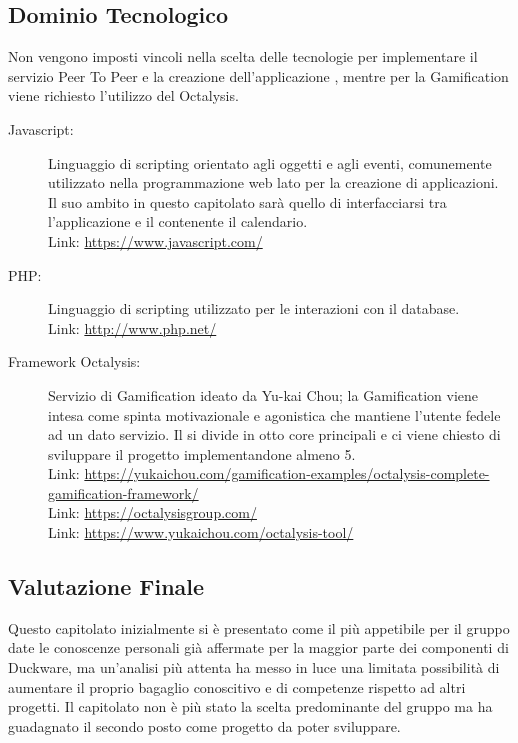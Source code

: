 \subsection{Dominio Tecnologico}
Non vengono imposti vincoli nella scelta delle tecnologie per implementare il servizio Peer To Peer e la creazione dell'applicazione , mentre per la Gamification viene richiesto l'utilizzo del  Octalysis.
\begin{description}
	\item[Javascript:] Linguaggio di scripting orientato agli oggetti e agli eventi, comunemente utilizzato nella programmazione web lato  per la creazione di applicazioni.
Il suo ambito in questo capitolato sarà quello di interfacciarsi tra l'applicazione e il  contenente il calendario.\\
Link: \href{https://www.javascript.com/}{https://www.javascript.com/}

	\item[PHP:]	Linguaggio di scripting utilizzato per le interazioni con il database.\\
Link: \href{http://www.php.net/}{http://www.php.net/}
						
	\item[Framework Octalysis:]	Servizio di Gamification ideato da Yu-kai Chou; la Gamification viene intesa come spinta motivazionale e agonistica che mantiene l'utente fedele ad un dato servizio. Il  si divide in otto core principali e ci viene chiesto di sviluppare il progetto implementandone almeno 5.\\ 
Link: \href{https://yukaichou.com/gamification-examples/octalysis-complete-gamification-framework/}{https://yukaichou.com/gamification-examples/octalysis-complete-gamification-framework/}\\
Link: \href{https://octalysisgroup.com/}{https://octalysisgroup.com/}\\
Link: \href{https://www.yukaichou.com/octalysis-tool/}{https://www.yukaichou.com/octalysis-tool/}
\end{description}

\subsection{Valutazione Finale}
Questo capitolato inizialmente si è presentato come il più appetibile per il gruppo date le conoscenze personali già affermate per la maggior parte dei componenti di Duckware, ma un'analisi più attenta ha messo in luce una limitata possibilità di aumentare il proprio bagaglio conoscitivo e di competenze rispetto ad altri progetti.
Il capitolato non è più stato la scelta predominante del gruppo ma ha guadagnato il secondo posto come progetto da poter sviluppare.
	
